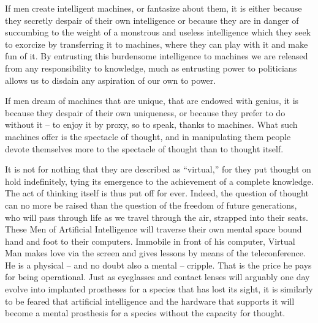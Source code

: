 \documentclass[10pt,twoside,openleft]{memoir}
\begin{document}
If men create intelligent machines, or fantasize about them, it is either because they secretly despair of their own intelligence or because they are in danger of succumbing to the weight of a monstrous and useless intelligence which they seek to exorcize by transferring it to machines, where they can play with it and make fun of it. By entrusting this burdensome intelligence to machines we are released from any responsibility to knowledge, much as entrusting power to politicians allows us to disdain any aspiration of our own to power.

If men dream of machines that are unique, that are endowed with genius, it is because they despair of their own uniqueness, or because they prefer to do without it -- to enjoy it by proxy, so to speak, thanks to machines. What such machines offer is the spectacle of thought, and in manipulating them people devote themselves more to the spectacle of thought than to thought itself. 

It is not for nothing that they are described as ``virtual,'' for they put thought on hold indefinitely, tying its emergence to the achievement of a complete knowledge. The act of thinking itself is thus put off for ever. Indeed, the question of thought can no more be raised than the question of the freedom of future generations, who will pass through life as we travel through the air, strapped into their seats. These Men of Artificial Intelligence will traverse their own mental space bound hand and foot to their computers. Immobile in front of his computer, Virtual Man makes love via the screen and gives lessons by means of the teleconference. He is a physical -- and no doubt also a mental -- cripple. That is the price he pays for being operational. Just as eyeglasses and contact lenses will arguably one day evolve into implanted prostheses for a species that has lost its sight, it is similarly to be feared that artificial intelligence and the hardware that supports it will become a mental prosthesis for a species without the capacity for thought.
\end{document}
